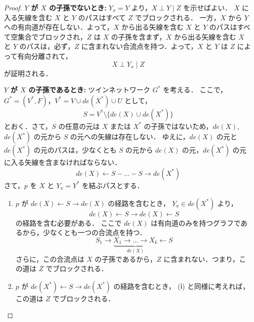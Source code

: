 \documentclass[uplatex, dvipdfmx]{jsarticle}
\begin{document}
\begin{proof}
  \textbf{$Y$ が $X$ の子孫でないとき:}
  $Y_x = Y$ より，$X \perp Y \mid Z$ を示せばよい．
  $X$ に入る矢線を含む $X$ と $Y$ のパスはすべて $Z$ でブロックされる．
  一方，$X$ から $Y$ への有向道が存在しない．よって，$X$ から出る矢線を含む $X$ と $Y$ のパスはすべて空集合でブロックされ，$Z$ は $X$ の子孫を含まず，$X$ から出る矢線を含む $X$ と $Y$ のパスは，必ず，$Z$ に含まれない合流点を持つ．よって，$X$ と $Y$ は $Z$ によって有向分離されて，
  \begin{equation}
    X \perp Y_x \mid Z
  \end{equation}
  が証明される．

  \textbf{$Y$ が $X$ の子孫であるとき:}
  ツインネットワーク $G^*$ を考える．
  ここで，$G^* = (V^*, F)$，$V^* = V \cup de(X^*) \cup U$ として，
  \begin{equation}
    S = V^* \setminus \{de(X) \cup de(X^*)\}
  \end{equation}
  とおく．さて，$S$ の任意の元は $X$ または $X^*$ の子孫ではないため，$de(X)$, $de(X^*)$ の元から $S$ の元への矢線は存在しない．
  ゆえに，$de(X)$ の元と $de(X^*)$ の元のパスは，少なくとも $S$ の元から $de(X)$ の元，$de(X^*)$ の元に入る矢線を含まなければならない．
  \begin{equation}
    de(X) \leftarrow S - \dots - S \rightarrow de(X^*)
  \end{equation}
  さて，$p$ を $X$ と $Y_x = Y^*$ を結ぶパスとする．
 
  \begin{enumerate}[label={(\roman*)}, leftmargin=*]
    \item $p$ が $de(X) \leftarrow S \rightarrow de(X)$ の経路を含むとき，
    $Y_x \in de(X^*)$ より，
    \begin{equation}
      de(X) \leftarrow S \rightarrow de(X) \leftarrow S
    \end{equation}
    の経路を含む必要がある．
    ここで $de(X)$ は有向道のみを持つグラフであるから，少なくとも一つの合流点を持つ．
    \begin{equation}
      S_1 \rightarrow \underbrace{X_1 \rightarrow \dots \rightarrow X_k}_{de(X)} \leftarrow S
    \end{equation}
    さらに，この合流点は $X$ の子孫であるから，$Z$ に含まれない．つまり，この道は $Z$ でブロックされる．

    \item $p$ が $de(X^*) \leftarrow S \rightarrow de(X^*)$ の経路を含むとき，
    (ⅰ) と同様に考えれば，この道は $Z$ でブロックされる．


\end{enumerate}
\end{proof}
\end{document}
